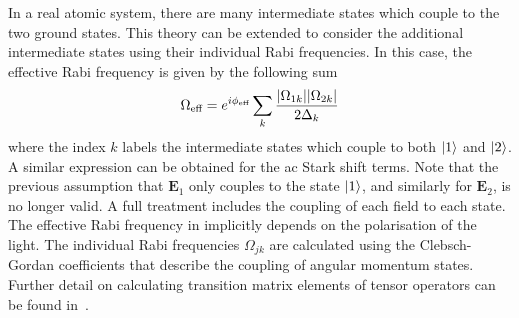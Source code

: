 In a real atomic system, there are many intermediate states which
couple to the two ground states. This theory can be extended to
consider the additional intermediate states using their individual
Rabi frequencies. In this case, the effective Rabi frequency is given
by the following sum
\begin{equation}
  \label{eq:rabi_raman_sum}
  \Omega_\textnormal{eff} = e^{i \phi_\textnormal{eff}}  \sum_k
\frac{|\Omega_{1k}| |\Omega_{2k}|}{2\Delta_k}
\end{equation}
where the index $k$ labels the intermediate states which couple to
both $\ket{1}$ and $\ket{2}$. A similar expression can be obtained for
the ac Stark shift terms. Note that the previous assumption that
$\textbf{E}_1$ only couples to the state $\ket{1}$, and similarly for
$\textbf{E}_2$, is no longer valid. A full treatment includes the
coupling of each field to each state. The effective Rabi frequency in  implicitly
depends on the polarisation of the light. The individual Rabi
frequencies $\Omega_{jk}$ are calculated using the Clebsch-Gordan
coefficients that describe the coupling of angular momentum states.
Further detail on calculating transition matrix elements of tensor
operators can be found in~\cite{Brink1968}.  
